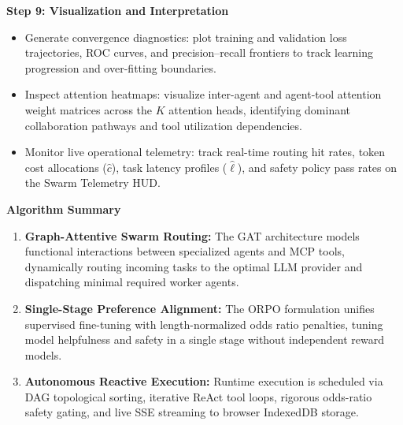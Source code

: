 \documentclass[11pt,a4paper]{article}
\begin{document}
\vspace{0.40em}
\textbf{Step 9: Visualization and Interpretation}
\begin{itemize}[leftmargin=1.8em, itemsep=0.22em, topsep=0.06em, label=$\blacktriangleright$]
    \item Generate convergence diagnostics: plot training and validation loss trajectories, ROC curves, and precision--recall frontiers to track learning progression and over-fitting boundaries.
    \item Inspect attention heatmaps: visualize inter-agent and agent-tool attention weight matrices across the $K$ attention heads, identifying dominant collaboration pathways and tool utilization dependencies.
    \item Monitor live operational telemetry: track real-time routing hit rates, token cost allocations ($\hat{c}$), task latency profiles ($\hat{\ell}$), and safety policy pass rates on the Swarm Telemetry HUD.
\end{itemize}

\vspace{0.40em}
\textbf{Algorithm Summary}
\begin{enumerate}[leftmargin=1.8em, itemsep=0.18em, topsep=0.05em]
    \item \textbf{Graph-Attentive Swarm Routing:} The GAT architecture models functional interactions between specialized agents and MCP tools, dynamically routing incoming tasks to the optimal LLM provider and dispatching minimal required worker agents.
    \item \textbf{Single-Stage Preference Alignment:} The ORPO formulation unifies supervised fine-tuning with length-normalized odds ratio penalties, tuning model helpfulness and safety in a single stage without independent reward models.
    \item \textbf{Autonomous Reactive Execution:} Runtime execution is scheduled via DAG topological sorting, iterative ReAct tool loops, rigorous odds-ratio safety gating, and live SSE streaming to browser IndexedDB storage.
\end{enumerate}
\end{document}
